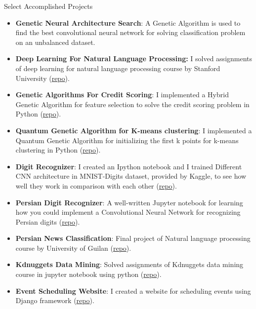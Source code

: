 \documentclass[]{mcdowellcv}
\begin{document}
    \begin{cvsection}{Select Accomplished Projects}
    	\begin{cvsubsection}{}{}{}
        	\begin{itemize}
        	    \item \textbf{Genetic Neural Architecture Search}: A Genetic Algorithm is used to find the best convolutional neural network for solving classification problem on an unbalanced dataset.
        	    \item \textbf{Deep Learning For Natural Language Processing:} I solved assignments of deep learning for natural language processing course by Stanford University (\href{https://github.com/erfanMhi/cs224n_Assignments}{repo}).
        	    \item \textbf{Genetic Algorithms For Credit Scoring}: I implemented a Hybrid Genetic Algorithm for feature selection to solve the credit scoring problem in Python (\href{https://github.com/erfanMhi/Genetic-algorithms-for-credit-scoring}{repo}).
        	    \item \textbf{Quantum Genetic Algorithm for K-means clustering}: I implemented a Quantum Genetic Algorithm for initializing the first k points for k-means clustering in Python (\href{https://github.com/erfanMhi/A-quantum-inspired-genetic-algorithm-for-k-means-clustering}{repo}).
        	    \item \textbf{Digit Recognizer}: I created an Ipython notebook and I trained Different CNN architecture in MNIST-Digits dataset, provided by Kaggle, to see how well they work in comparison with each other (\href{https://github.com/erfanMhi/Digit_Recognizer}{repo}).
        	    \item \textbf{Persian Digit Recognizer}: A well-written Jupyter notebook for learning how you could implement a Convolutional Neural Network for recognizing Persian digits (\href{https://github.com/erfanMhi/Persian-Digits-Recognizer}{repo}).
        	    \item \textbf{Persian News Classification}: Final project of Natural language processing course by University of Guilan (\href{https://github.com/Nikronic/NLP-Fall18-UOG/}{repo}).
        	    \item \textbf{Kdnuggets Data Mining}: Solved assignments of Kdnuggets data mining course in jupyter notebook using python (\href{https://github.com/erfanMhi/kdnuggets-data-mining-course}{repo}).
        	    \item \textbf{Event Scheduling Website}: I created a website for scheduling events using Django framework (\href{https://github.com/erfanMhi/School-Of-AI-Rasht-Chapter-Website}{repo}).

\end{itemize}
\end{cvsubsection}
\end{cvsection}
\end{document}
